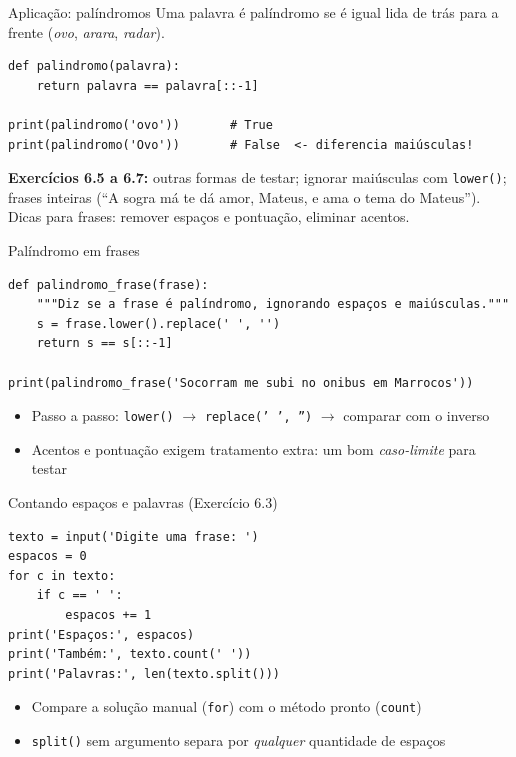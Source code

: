 \documentclass[aspectratio=169,10pt,t]{beamer}
\begin{document}
\begin{frame}[fragile]{Aplicação: palíndromos}
  Uma palavra é palíndromo se é igual lida de trás para a frente (\emph{ovo}, \emph{arara}, \emph{radar}).
\begin{lstlisting}
def palindromo(palavra):
    return palavra == palavra[::-1]

print(palindromo('ovo'))       # True
print(palindromo('Ovo'))       # False  <- diferencia maiúsculas!
\end{lstlisting}
  \textbf{Exercícios 6.5 a 6.7:} outras formas de testar; ignorar maiúsculas com \texttt{lower()}; frases inteiras (``A sogra má te dá amor, Mateus, e ama o tema do Mateus''). Dicas para frases: remover espaços e pontuação, eliminar acentos.
\end{frame}

\begin{frame}[fragile]{Palíndromo em frases}
\begin{lstlisting}
def palindromo_frase(frase):
    """Diz se a frase é palíndromo, ignorando espaços e maiúsculas."""
    s = frase.lower().replace(' ', '')
    return s == s[::-1]

print(palindromo_frase('Socorram me subi no onibus em Marrocos'))
\end{lstlisting}
  \begin{itemize}
    \item Passo a passo: \texttt{lower()} \(\to\) \texttt{replace(' ', '')} \(\to\) comparar com o inverso
    \item Acentos e pontuação exigem tratamento extra: um bom \emph{caso-limite} para testar
  \end{itemize}
\end{frame}

\begin{frame}[fragile]{Contando espaços e palavras (Exercício 6.3)}
\begin{lstlisting}
texto = input('Digite uma frase: ')
espacos = 0
for c in texto:
    if c == ' ':
        espacos += 1
print('Espaços:', espacos)
print('Também:', texto.count(' '))
print('Palavras:', len(texto.split()))
\end{lstlisting}
  \begin{itemize}
    \item Compare a solução manual (\texttt{for}) com o método pronto (\texttt{count})
    \item \texttt{split()} sem argumento separa por \emph{qualquer} quantidade de espaços
  \end{itemize}
\end{frame}
\end{document}
